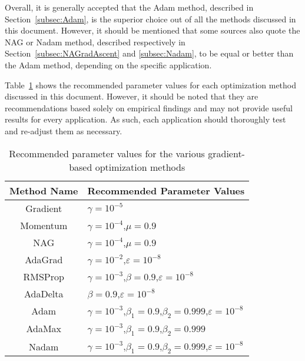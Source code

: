 \documentclass{article}
\begin{document}
Overall, it is generally accepted that the Adam method, described in Section~\ref{subsec:Adam}, is the superior choice out of all the methods discussed in this document. However, it should be mentioned that some sources also quote the NAG or Nadam method, described respectively in Section~\ref{subsec:NAGradAscent} and \ref{subsec:Nadam}, to be equal or better than the Adam method, depending on the specific application.

Table~\ref{tbl:RecommendedParameterValues} shows the recommended parameter values for each optimization method discussed in this document. However, it should be noted that they are recommendations based solely on empirical findings and may not provide useful results for every application. As such, each application should thoroughly test and re-adjust them as necessary.

\begin{table}[h]
	\centering
	\begin{tabular}{c|l}
		\toprule
		Method Name & Recommended Parameter Values \\
		\midrule
		Gradient & $\gamma = 10^{-5}$ \\
		Momentum & $\gamma = 10^{-4}$,\enspace $\mu = 0.9$ \\
		NAG & $\gamma = 10^{-4}$,\enspace $\mu = 0.9$ \\
		AdaGrad & $\gamma = 10^{-2}$,\enspace $\varepsilon = 10^{-8}$ \\
		RMSProp & $\gamma = 10^{-3}$,\enspace $\beta = 0.9$,\enspace $\varepsilon = 10^{-8}$ \\
		AdaDelta & $\beta = 0.9$,\enspace $\varepsilon = 10^{-8}$ \\
		Adam & $\gamma = 10^{-3}$,\enspace $\beta_1 = 0.9$,\enspace $\beta_2 = 0.999$,\enspace $\varepsilon = 10^{-8}$ \\
		AdaMax & $\gamma = 10^{-3}$,\enspace $\beta_1 = 0.9$,\enspace $\beta_2 = 0.999$ \\
		Nadam & $\gamma = 10^{-3}$,\enspace $\beta_1 = 0.9$,\enspace $\beta_2 = 0.999$,\enspace $\varepsilon = 10^{-8}$ \\
		\bottomrule
	\end{tabular}
	\caption{Recommended parameter values for the various gradient-based optimization methods}
	\label{tbl:RecommendedParameterValues}
\end{table}

\printbibliography
\end{document}
